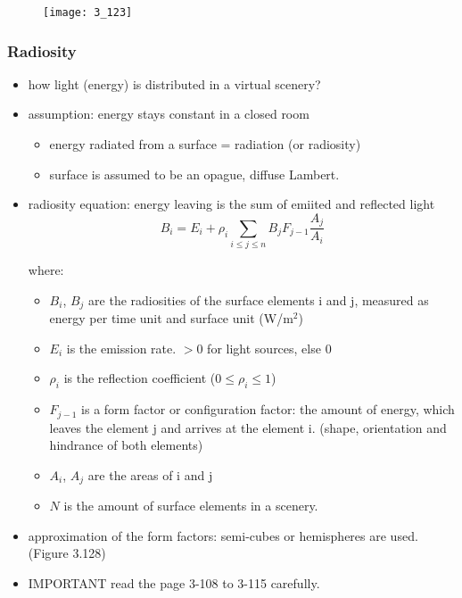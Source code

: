 \documentclass{standalone}
\begin{document}
\begin{figure}[H]
	\texttt{[image: 3\_123]}
\end{figure}


\setcounter{subsubsection}{4}
\subsubsection{Radiosity}

\begin{itemize}
	\item how light (energy) is distributed in a virtual scenery?
	\item assumption: energy stays constant in a closed room 
		\begin{itemize}
			\item energy radiated from a surface = radiation (or radiosity)
			\item surface is assumed to be an opague, diffuse Lambert. 
		\end{itemize}
	\item radiosity equation: energy leaving is the sum of emiited and reflected light
		\begin{equation}
			B_i = E_i + \rho_i \sum_{i \leq j \leq n} B_j F_{j-1} \frac{A_j}{A_i}
		\end{equation}
		
		where:
		
		\begin{itemize}
			\item $B_i$, $B_j$ are the radiosities of the surface elements i and j, measured as energy per time unit and surface unit (W/m$^2$)
			\item $E_i$ is the emission rate. $> 0$ for light sources, else $0$
			\item $\rho_i$ is the reflection coefficient ($0 \leq \rho_i \leq 1$)
			\item $F_{j-1}$ is a form factor or configuration factor: the amount of energy, which leaves the element j and arrives at the element i. (shape, orientation and hindrance of both elements)
			\item $A_i$, $A_j$ are the areas of i and j
			\item $N$ is the amount of surface elements in a scenery.
		\end{itemize}
	\item approximation of the form factors: semi-cubes or hemispheres are used. (Figure 3.128)
	\item IMPORTANT read the page 3-108 to 3-115 carefully.
\end{itemize}
\end{document}
